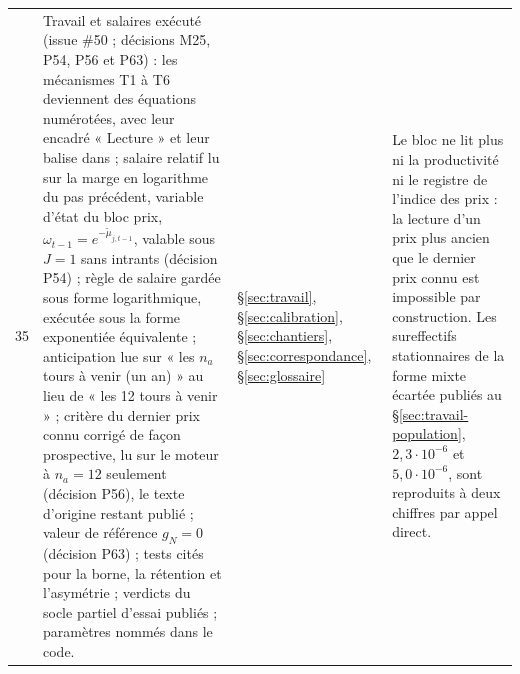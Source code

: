 \documentclass[11pt,a4paper]{article}
\newcommand{\code}[1]{\texttt{\detokenize{#1}}}
\begin{document}
\begin{center}
\begin{longtable}{p{0.5cm}>{\raggedright\arraybackslash}p{6.3cm}>{\raggedright\arraybackslash}p{2.1cm}>{\raggedright\arraybackslash}p{5.8cm}}
35 & Travail et salaires exécuté (issue \#50 ; décisions M25, P54, P56 et P63) : les mécanismes T1 à T6 deviennent des équations numérotées, avec leur encadré « Lecture » et leur balise dans \code{nations.blocs.travail} ; salaire relatif lu sur la marge en logarithme du pas précédent, variable d'état du bloc prix, $\omega_{t-1} = e^{-\tilde\mu_{j,t-1}}$, valable sous $J = 1$ sans intrants (décision P54) ; règle de salaire gardée sous forme logarithmique, exécutée sous la forme exponentiée équivalente ; anticipation lue sur « les $n_a$ tours à venir (un an) » au lieu de « les 12 tours à venir » ; critère du dernier prix connu corrigé de façon prospective, lu sur le moteur à $n_a = 12$ seulement (décision P56), le texte d'origine restant publié ; valeur de référence $g_N = 0$ (décision P63) ; tests cités pour la borne, la rétention et l'asymétrie ; verdicts du socle partiel d'essai publiés ; paramètres nommés dans le code. & \S\ref{sec:travail}, \S\ref{sec:calibration}, \S\ref{sec:chantiers}, \S\ref{sec:correspondance}, \S\ref{sec:glossaire} & Le bloc ne lit plus ni la productivité ni le registre de l'indice des prix : la lecture d'un prix plus ancien que le dernier prix connu est impossible par construction. Les sureffectifs stationnaires de la forme mixte écartée publiés au \S\ref{sec:travail-population}, $2{,}3 \cdot 10^{-6}$ et $5{,}0 \cdot 10^{-6}$, sont reproduits à deux chiffres par appel direct.\\

\end{longtable}
\end{center}
\end{document}
